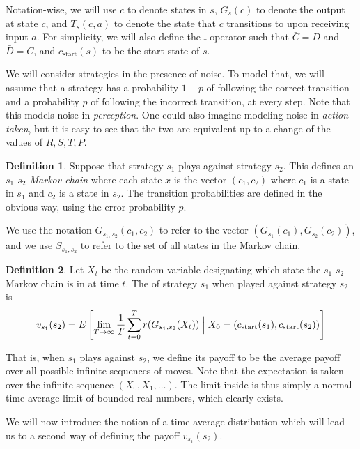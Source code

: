 \documentclass[11pt]{amsart}
\theoremstyle{definition}
\newtheorem{definition}{Definition}
\theoremstyle{remark}
\begin{document}
Notation-wise, we will use $c$ to denote states in $s$, $G_s(c)$ to denote the output at state $c$, and $T_s(c, a)$ to denote the state that $c$ transitions to upon receiving input $a$. For simplicity, we will also define the $\bar{\;}$ operator such that $\bar{C} = D$ and $\bar{D} = C$, and $c_{\text{start}}(s)$ to be the start state of $s$.

We will consider strategies in the presence of noise. To model that, we will assume that a strategy has a probability $1-p$ of following the correct transition and a probability $p$ of following the incorrect transition, at every step. Note that this models noise in \textit{perception}. One could also imagine modeling noise in \textit{action taken}, but it is easy to see that the two are equivalent up to a change of the values of $R, S, T, P$.

\begin{definition}
  Suppose that strategy $s_1$ plays against strategy $s_2$. This defines an \textit{$s_1$-$s_2$ Markov chain} where each state $x$ is the vector $(c_1,c_2)$ where $c_1$ is a state in $s_1$ and $c_2$ is a state in $s_2$. The transition probabilities are defined in the obvious way, using the error probability $p$.
\end{definition}

We use the notation $G_{s_1,s_2}(c_1,c_2)$ to refer to the vector $(G_{s_1}(c_1), G_{s_2}(c_2))$, and we use $S_{s_1,s_2}$ to refer to the set of all states in the Markov chain.

\begin{definition}
  \label{strategypayoffs}
  Let $X_t$ be the random variable designating which state the $s_1$-$s_2$ Markov chain is in at time $t$. The  of strategy $s_1$ when played against strategy $s_2$ is 
  \begin{equation*}
    v_{s_1}(s_2) = E \left[ \lim_{T \to \infty} \frac{1}{T} \sum_{t=0}^T r(G_{s_1,s_2} (X_t)) \Bigm| X_0 = (c_{\text{start}}(s_1), c_{\text{start}}(s_2)) \right]
  \end{equation*}
\end{definition}

That is, when $s_1$ plays against $s_2$, we define its payoff to be the average payoff over all possible infinite sequences of moves. Note that the expectation is taken over the infinite sequence $(X_0, X_1, \ldots)$. The limit inside is thus simply a normal time average limit of bounded real numbers, which clearly exists. 

We will now introduce the notion of a time average distribution which will lead us to a second way of defining the payoff $v_{s_1}(s_2)$. 
\end{document}
